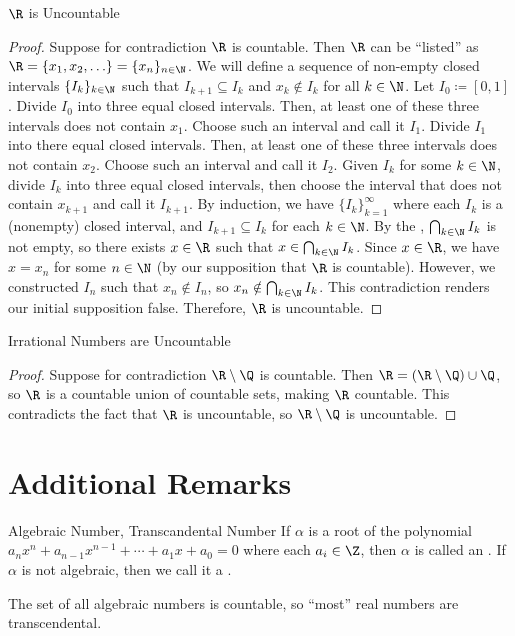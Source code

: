 \begin{thmbox}{$\R$ is Uncountable}{}
    \begin{proof}
        Suppose for contradiction $\R$ is countable. Then $\R$ can be ``listed'' as $\R = \{x_1, x_2, \ldots\} = \{x_n\}_{n \in \N}$. We will define a sequence of non-empty closed intervals $\{I_k\}_{k \in \N}$ such that $I_{k+1} \subseteq I_k$ and $x_k \notin I_k$ for all $k \in \N$. Let $I_0 \coloneq [0,1]$. Divide $I_0$ into three equal closed intervals. Then, at least one of these three intervals does not contain $x_1$. Choose such an interval and call it $I_1$. Divide $I_1$ into there equal closed intervals. Then, at least one of these three intervals does not contain $x_2$. Choose such an interval and call it $I_2$. Given $I_k$ for some $k \in \N$, divide $I_k$ into three equal closed intervals, then choose the interval that does not contain $x_{k+1}$ and call it $I_{k+1}$. By induction, we have $\{I_k\}_{k=1}^\infty$ where each $I_k$ is a (nonempty) closed interval, and $I_{k+1} \subseteq I_k$ for each $k \in \N$. By the , $\bigcap_{k \in \N} I_k$ is not empty, so there exists $x \in \R$ such that $x \in \bigcap_{k \in \N} I_k$. Since $x \in \R$, we have $x = x_n$ for some $n \in \N$ (by our supposition that $\R$ is countable). However, we constructed $I_n$ such that $x_n \notin I_n$, so $x_n \notin \bigcap_{k \in \N} I_k$. This contradiction renders our initial supposition false. Therefore, $\R$ is uncountable.
    \end{proof}
\end{thmbox}

\begin{thmbox}{Irrational Numbers are Uncountable}{}
    \begin{proof}
        Suppose for contradiction $\R \setminus \Q$ is countable. Then $\R = (\R \setminus \Q) \cup \Q$, so $\R$ is a countable union of countable sets, making $\R$ countable. This contradicts the fact that $\R$ is uncountable, so $\R \setminus \Q$ is uncountable.
    \end{proof}
\end{thmbox}

\section{Additional Remarks}
\begin{dfnbox}{Algebraic Number, Transcandental Number}{}
    If $\alpha$ is a root of the polynomial $a_nx^n + a_{n-1} x^{n-1} + \cdots + a_1 x + a_0 = 0$ where each $a_i \in \Z$, then $\alpha$ is called an . If $\alpha$ is not algebraic, then we call it a .
\end{dfnbox}
 The set of all algebraic numbers is countable, so ``most'' real numbers are transcendental.

